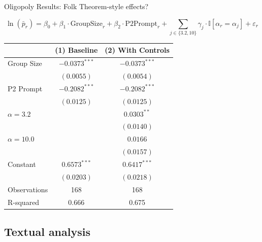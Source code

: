 \documentclass[10pt, aspectratio=169]{beamer}
\begin{document}
\begin{frame}{Oligopoly Results: Folk Theorem-style effects?}

\scriptsize %
\begin{tcolorbox}[colback=myorange!10, colframe=myorange, width=\textwidth]
$$
\ln(\bar{p}_r) = \beta_0 + \beta_1 \cdot \text{GroupSize}_r + \beta_2 \cdot \text{P2Prompt}_r + 
\sum_{j \in \{3.2, 10\}} \gamma_j \cdot \mathbb{I}[\alpha_r = \alpha_j] + \varepsilon_r
$$
\end{tcolorbox}

\vspace{-1em}

\centering
\begin{threeparttable}
\caption{Run-Level Regression: Group Size and Prompt Effects on Log Price}
\begin{tabular}{lcc}
\toprule
& (1) Baseline & (2) With Controls \\
\midrule
Group Size & $-0.0373^{***}$ & $-0.0373^{***}$ \\
          & $(0.0055)$       & $(0.0054)$       \\
P2 Prompt & $-0.2082^{***}$  & $-0.2082^{***}$  \\
          & $(0.0125)$       & $(0.0125)$       \\
$\alpha = 3.2$ &             & $0.0303^{**}$    \\
              &             & $(0.0140)$       \\
$\alpha = 10.0$&             & $0.0166$         \\
              &             & $(0.0157)$       \\
Constant      & $0.6573^{***}$ & $0.6417^{***}$ \\
              & $(0.0203)$     & $(0.0218)$     \\
\midrule
Observations  & 168           & 168             \\
R-squared     & 0.666         & 0.675           \\
\bottomrule
\end{tabular}
\end{threeparttable}

\end{frame}

\subsection{Textual analysis}
\end{document}
